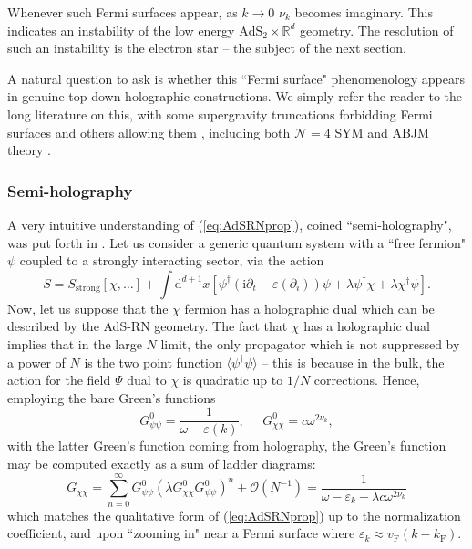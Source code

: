 \documentclass[10pt, oneside]{book}
\begin{document}
\begin{doublespace}
Whenever such Fermi surfaces appear, as $k \rightarrow 0$ $\nu_k$ becomes imaginary.   This indicates an instability of the low energy $\mathrm{AdS}_2\times \mathbb{R}^d$ geometry.   The resolution of such an instability is the electron star -- the subject of the next section.

A natural question to ask is whether this ``Fermi surface" phenomenology appears in genuine top-down holographic constructions.   We simply refer the reader to the long literature on this, with some supergravity truncations forbidding Fermi surfaces \cite{Belliard:2011qq} and others allowing them \cite{DeWolfe:2011aa}, including both $\mathcal{N}=4$ SYM \cite{DeWolfe:2012uv} and ABJM theory \cite{DeWolfe:2014ifa}.

\subsubsection{Semi-holography}
A very intuitive understanding of (\ref{eq:AdSRNprop}), coined ``semi-holography",  was put forth in \cite{Faulkner:2010tq}.    Let us consider a generic quantum system with a ``free fermion" $\psi$ coupled to a strongly interacting sector, via the  action \begin{equation}
S = S_{\mathrm{strong}}[\chi,\ldots] + \int \mathrm{d}^{d+1}x \left[\psi^\dagger\left(\mathrm{i}\partial_t - \varepsilon(\partial_i)\right)\psi  + \lambda \psi^\dagger \chi  + \lambda \chi^\dagger \psi \right].
\end{equation}
Now, let us suppose that the $\chi$ fermion has a holographic dual which can be described by the AdS-RN geometry.   The fact that $\chi$ has a holographic dual implies that in the large $N$ limit, the only propagator which is not suppressed by a power of $N$ is the two point function $\langle \psi^\dagger \psi\rangle $ -- this is because in the bulk, the action for the field $\Psi$ dual to $\chi$ is quadratic up to $1/N$ corrections.   Hence, employing the bare Green's functions \begin{equation}
G^0_{\psi\psi} = \frac{1}{\omega - \varepsilon(k)}, \;\;\;\;\; G^0_{\chi\chi} = c\omega^{2\nu_k},
\end{equation}
with the latter Green's function coming from holography,  the Green's function may be computed exactly as a sum of ladder diagrams:  \begin{equation}
G_{\chi\chi} = \sum_{n=0}^\infty G^0_{\psi\psi} \left(\lambda G^0_{\chi\chi}G^0_{\psi\psi}\right)^n+ \mathcal{O}\left(N^{-1}\right) = \frac{1}{\omega - \varepsilon_k - \lambda c \omega^{2\nu_k}}
\end{equation}
which matches the qualitative form of (\ref{eq:AdSRNprop}) up to the normalization coefficient, and upon ``zooming in" near a Fermi surface where $\varepsilon_k \approx v_{\mathrm{F}}(k-k_{\mathrm{F}})$.


\end{doublespace}
\end{document}
